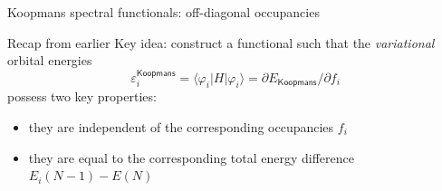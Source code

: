 \documentclass[xcolor=table,aspectratio=169]{beamer}
\newcommand{\braopket}[3]{\langle #1|#2|#3\rangle}
\numberwithin{equation}{section}
\begin{document}
\begin{frame}{\small Koopmans spectral functionals: off-diagonal occupancies}
   \begin{block}{Recap from earlier}
      Key idea: construct a functional such that the \emph{variational} orbital energies
      \begin{equation*}
         \varepsilon^\mathsf{Koopmans}_i = \braopket{\varphi_i}{H}{\varphi_i} = \partial E_\mathsf{Koopmans}/\partial f_i
      \end{equation*}
      possess two key properties:
      \begin{itemize}
         \item they are independent of the corresponding occupancies $f_i$
         \item they are equal to the corresponding total energy difference $E_i(N-1) - E(N)$
      \end{itemize}
   \end{block}

\end{frame}
\end{document}

